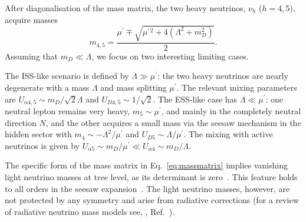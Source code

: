 After diagonalisation of the mass matrix, the two heavy neutrinos,  $\nu_h$ ($h=4,5$), acquire masses
\[m_{4,5} = \frac{\mu^\prime \mp \sqrt{\mu^{\prime\,2} + 4 (\Lambda^2 + m_D^2) } }{2}.\]
Assuming that $m_D \ll \Lambda$, we focus on two interesting limiting cases. 

The ISS-like scenario is defined by $\Lambda \gg \mu^\prime$: the two heavy neutrinos are nearly degenerate with a mass $\Lambda$ and mass splitting $\mu^\prime$. The relevant mixing parameters are $U_{\alpha 4,5} \sim m_D/\sqrt{2} \Lambda$ and $U_{D4,5} \sim 1/\sqrt{2}$.
The ESS-like case has $\Lambda \ll \mu^\prime$: one neutral lepton remains very heavy, $m_5 \sim \mu^\prime$, and mainly in the completely neutral direction $N$, and the other acquires a small mass via the seesaw mechanism in the hidden sector with $m_4 \sim - \Lambda^2/\mu^\prime$ and $U_{D5} \sim \Lambda/ \mu^\prime$. The mixing with active neutrinos is given by $U_{\alpha 5} \sim m_D/\mu^\prime \ll U_{\alpha 4} \sim m_D/\Lambda$.

The specific form of the mass matrix in Eq.~\ref{eq:massmatrix} implies vanishing light neutrino masses at tree level, as its determinant is zero~\cite{Dev:2012sg,LopezPavon:2012zg}. This feature holds to all orders in the seesaw expansion~\cite{Grimus:2000vj,Adhikari:2010yt,LopezPavon:2012zg}. The light neutrino masses, however, are not protected by any symmetry and arise from radiative corrections (for a review of radiative neutrino mass models see, \eg, Ref.~\cite{Cai:2017jrq}). 



